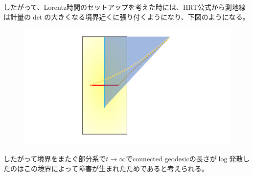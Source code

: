 したがって、Lorentz時間のセットアップを考えた時には、HRT公式から測地線は計量の$\det$の大きくなる境界近くに張り付くようになり、下図のようになる。
\begin{figure}[H]
	\centering
	\includegraphics[width=0.7\linewidth]{SQgeod.pdf}
\end{figure}

したがって境界をまたぐ部分系で$t\to \infty$でconnected geodesicの長さが$\log$発散したのはこの境界によって障害が生まれたためであると考えられる。
